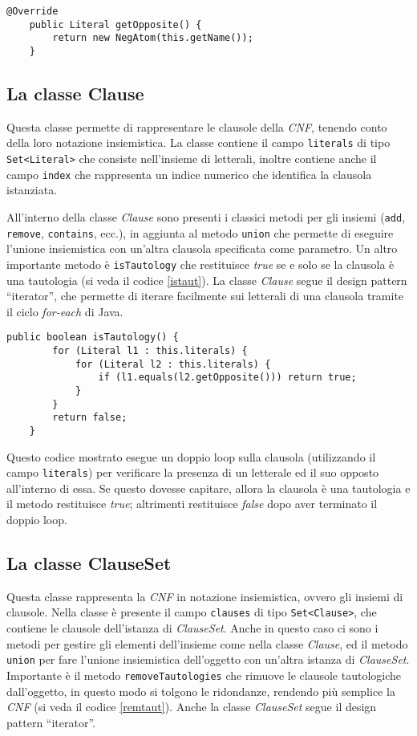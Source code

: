 \documentclass[a4paper,12pt]{report}
\begin{document}
\begin{lstlisting}[title={metodo getOpposite sovrascritto dalla classe Atom}]
    @Override
    public Literal getOpposite() {
        return new NegAtom(this.getName());
    }
\end{lstlisting}

\subsection{La classe Clause}
Questa classe permette di rappresentare le clausole della \textit{CNF}, tenendo conto della loro notazione insiemistica. La classe contiene il campo \texttt{literals} di tipo \texttt{Set<Literal>} che consiste nell'insieme di letterali, inoltre contiene anche il campo \texttt{index} che rappresenta un indice numerico che identifica la clausola istanziata.

All'interno della classe \textit{Clause} sono presenti i classici metodi per gli insiemi (\texttt{add}, \texttt{remove}, \texttt{contains}, ecc.), in aggiunta al metodo \texttt{union} che permette di eseguire l'unione insiemistica con un'altra clausola specificata come parametro. Un altro importante metodo è \texttt{isTautology} che restituisce \textit{true} se e solo se la clausola è una tautologia (si veda il codice \ref{istaut}). La classe \textit{Clause} segue il design pattern ``iterator'', che permette di iterare facilmente sui letterali di una clausola tramite il ciclo \textit{for-each} di Java.

\begin{lstlisting}[caption={Metodo isTautology della classe Clause}, label={istaut}]
    public boolean isTautology() {
        for (Literal l1 : this.literals) {
            for (Literal l2 : this.literals) { 
                if (l1.equals(l2.getOpposite())) return true;
            }
        }
        return false;
    }
\end{lstlisting}
Questo codice mostrato esegue un doppio loop sulla clausola (utilizzando il campo \texttt{literals}) per verificare la presenza di un letterale ed il suo opposto all'interno di essa. Se questo dovesse capitare, allora la clausola è una tautologia e il metodo restituisce \textit{true}; altrimenti restituisce \textit{false} dopo aver terminato il doppio loop.

\subsection{La classe ClauseSet}
Questa classe rappresenta la \textit{CNF} in notazione insiemistica, ovvero gli insiemi di clausole. Nella classe è presente il campo \texttt{clauses} di tipo \texttt{Set<Clause>}, che contiene le clausole dell'istanza di \textit{ClauseSet}. Anche in questo caso ci sono i metodi per gestire gli elementi dell'insieme come nella classe \textit{Clause}, ed il metodo \texttt{union} per fare l'unione insiemistica dell'oggetto con un'altra istanza di \textit{ClauseSet}. Importante è il metodo \texttt{removeTautologies} che rimuove le clausole tautologiche dall'oggetto, in questo modo si tolgono le ridondanze, rendendo più semplice la \textit{CNF} (si veda il codice \ref{remtaut}). Anche la classe \textit{ClauseSet} segue il design pattern ``iterator''.
\end{document}
